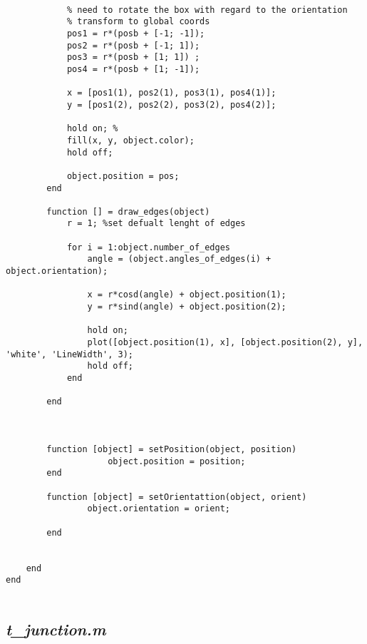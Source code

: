 \begin{lstlisting}
            
            % need to rotate the box with regard to the orientation
            % transform to global coords
            pos1 = r*(posb + [-1; -1]);
            pos2 = r*(posb + [-1; 1]);
            pos3 = r*(posb + [1; 1]) ;
            pos4 = r*(posb + [1; -1]);
            
            x = [pos1(1), pos2(1), pos3(1), pos4(1)];
            y = [pos1(2), pos2(2), pos3(2), pos4(2)];
            
            hold on; % 
            fill(x, y, object.color);
            hold off;
            
            object.position = pos;
        end
        
        function [] = draw_edges(object)
            r = 1; %set defualt lenght of edges
            
            for i = 1:object.number_of_edges
                angle = (object.angles_of_edges(i) + object.orientation);
                
                x = r*cosd(angle) + object.position(1);
                y = r*sind(angle) + object.position(2);
             
                hold on;
                plot([object.position(1), x], [object.position(2), y], 'white', 'LineWidth', 3);
                hold off;
            end
        
        end
        
        
        
        function [object] = setPosition(object, position)
                    object.position = position;
        end
        
        function [object] = setOrientattion(object, orient)
                object.orientation = orient;
            
        end
        
        
    end 
end
 

\end{lstlisting}


\subsection{\emph{t\_junction.m}}

